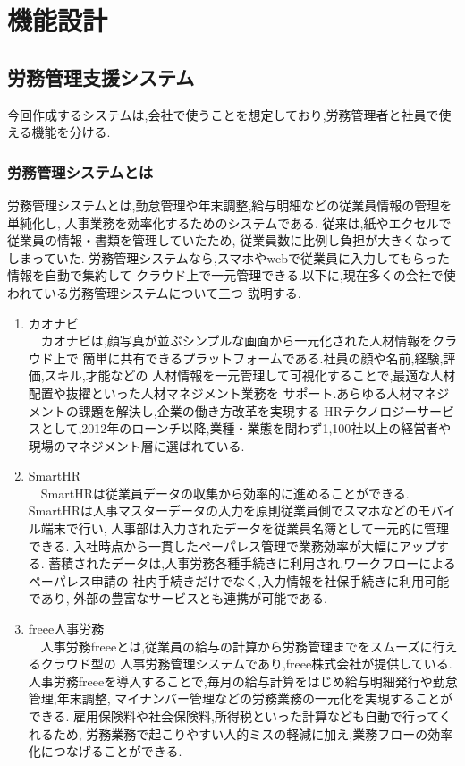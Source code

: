\chapter{機能設計}
\label{chp:chart}

\section{労務管理支援システム}
\label{sec:chart_figure}
今回作成するシステムは,会社で使うことを想定しており,労務管理者と社員で使える機能を分ける.

\subsection{労務管理システムとは}
労務管理システムとは,勤怠管理や年末調整,給与明細などの従業員情報の管理を単純化し,
人事業務を効率化するためのシステムである.
従来は,紙やエクセルで従業員の情報・書類を管理していたため,
従業員数に比例し負担が大きくなってしまっていた.
労務管理システムなら,スマホやwebで従業員に入力してもらった情報を自動で集約して
クラウド上で一元管理できる.以下に,現在多くの会社で使われている労務管理システムについて三つ
説明する.

\renewcommand{\labelenumi}{(\arabic{enumi})}

\begin{enumerate}
  \item カオナビ \\
  　カオナビは,顔写真が並ぶシンプルな画面から一元化された人材情報をクラウド上で
  簡単に共有できるプラットフォームである.社員の顔や名前,経験,評価,スキル,才能などの
  人材情報を一元管理して可視化することで,最適な人材配置や抜擢といった人材マネジメント業務を
  サポート.あらゆる人材マネジメントの課題を解決し,企業の働き方改革を実現する
  HRテクノロジーサービスとして,2012年のローンチ以降,業種・業態を問わず1,100社以上の経営者や
  現場のマネジメント層に選ばれている. \\

  \item SmartHR\\
  　SmartHRは従業員データの収集から効率的に進めることができる.
  SmartHRは人事マスターデータの入力を原則従業員側でスマホなどのモバイル端末で行い,
  人事部は入力されたデータを従業員名簿として一元的に管理できる.
  入社時点から一貫したペーパレス管理で業務効率が大幅にアップする.
  蓄積されたデータは,人事労務各種手続きに利用され,ワークフローによるペーパレス申請の
  社内手続きだけでなく,入力情報を社保手続きに利用可能であり,
  外部の豊富なサービスとも連携が可能である. \\

  \item freee人事労務\\
  　人事労務freeeとは,従業員の給与の計算から労務管理までをスムーズに行えるクラウド型の
  人事労務管理システムであり,freee株式会社が提供している.
人事労務freeeを導入することで,毎月の給与計算をはじめ給与明細発行や勤怠管理,年末調整,
マイナンバー管理などの労務業務の一元化を実現することができる.
雇用保険料や社会保険料,所得税といった計算なども自動で行ってくれるため,
労務業務で起こりやすい人的ミスの軽減に加え,業務フローの効率化につなげることができる.
\end{enumerate}

